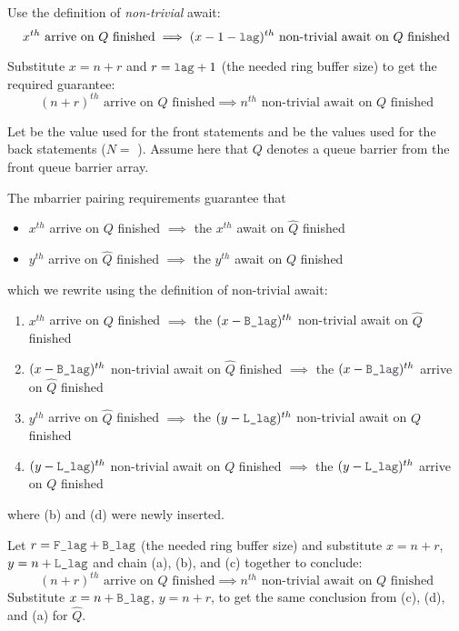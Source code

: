 \filbreak
Use the definition of \textit{non-trivial} await:
\begin{equation*}
  x^{th} \text{ arrive on $Q$ finished} \implies (x-1-\lighttt{lag})^{th} \text{ non-trivial await on $Q$ finished}
\end{equation*}

\filbreak
Substitute $x=n+r$ and $r=\lighttt{lag}+1$ (the needed ring buffer size) to get the required guarantee:
\begin{equation*}
  (n+r)^{th} \text{ arrive on $Q$ finished} \implies n^{th} \text{ non-trivial await on $Q$ finished}
\end{equation*}

\filbreak
{}
Let  be the  value used for the front  statements and  be the  values used for the back  statements ($N =$ ).
Assume here that $Q$ denotes a queue barrier from the front queue barrier array.

\filbreak
The mbarrier pairing requirements guarantee that
\begin{itemize}
  \item $x^{th}$ arrive on $Q$ finished $\implies$ the $x^{th}$ await on $\widehat{Q}$ finished
  \filbreak
  \item $y^{th}$ arrive on $\widehat{Q}$ finished $\implies$ the $y^{th}$ await on $Q$ finished
\end{itemize}
\filbreak
which we rewrite using the definition of non-trivial await:
\begin{enumerate}
  \item $x^{th}$ arrive on $Q$ finished $\implies$ the $(x-\lighttt{B\_lag})^{th}$ non-trivial await on $\widehat{Q}$ finished
  \filbreak
  \item $(x-\lighttt{B\_lag})^{th}$ non-trivial await on $\widehat{Q}$ finished $\implies$ the $(x-\lighttt{B\_lag})^{th}$ arrive on $\widehat{Q}$ finished
  \filbreak
  \item $y^{th}$ arrive on $\widehat{Q}$ finished $\implies$ the $(y-\lighttt{L\_lag})^{th}$ non-trivial await on $Q$ finished
  \filbreak
  \item $(y-\lighttt{L\_lag})^{th}$ non-trivial await on $Q$ finished $\implies$ the $(y-\lighttt{L\_lag})^{th}$ arrive on $Q$ finished
\end{enumerate}
where (b) and (d) were newly inserted.

\filbreak
Let $r = \lighttt{F\_lag} + \lighttt{B\_lag}$ (the needed ring buffer size) and substitute $x = n + r$, $y = n + \lighttt{L\_lag}$ and chain (a), (b), and (c) together to conclude:
\begin{equation*}
  (n+r)^{th} \text{ arrive on $Q$ finished} \implies n^{th} \text{ non-trivial await on $Q$ finished}
\end{equation*}
Substitute $x = n + \lighttt{B\_lag}$, $y = n+r$, to get the same conclusion from (c), (d), and (a) for $\widehat{Q}$.

